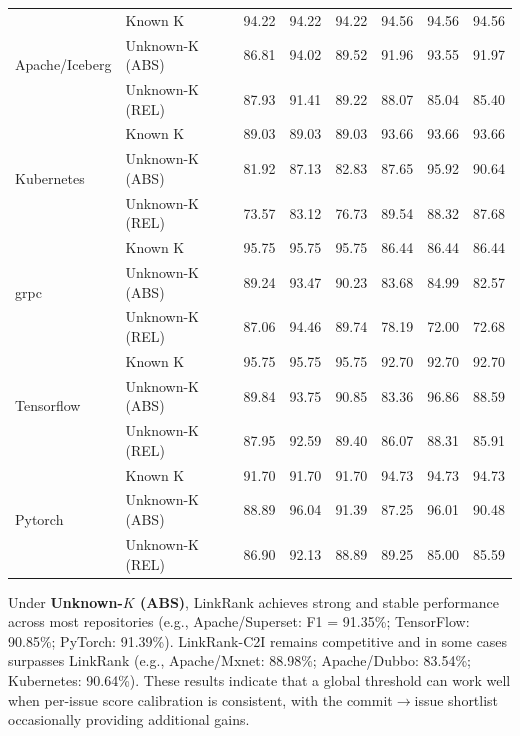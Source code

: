 \begin{table}[htbp]
\begin{tabular}{@{}llcccccc@{}}
\multirow{3}{*}{Apache/Iceberg}
 & Known K         & 94.22 & 94.22 & 94.22 & 94.56 & 94.56 & 94.56 \\
 & Unknown-K (ABS) & 86.81 & 94.02 & 89.52 & 91.96 & 93.55 & 91.97 \\
 & Unknown-K (REL) & 87.93 & 91.41 & 89.22 & 88.07 & 85.04 & 85.40 \\
\midrule

\multirow{3}{*}{Kubernetes}
 & Known K         & 89.03 & 89.03 & 89.03 & 93.66 & 93.66 & 93.66 \\
 & Unknown-K (ABS) & 81.92 & 87.13 & 82.83 & 87.65 & 95.92 & 90.64 \\
 & Unknown-K (REL) & 73.57 & 83.12 & 76.73 & 89.54 & 88.32 & 87.68 \\
\midrule

\multirow{3}{*}{grpc}
 & Known K         & 95.75 & 95.75 & 95.75 & 86.44 & 86.44 & 86.44 \\
 & Unknown-K (ABS) & 89.24 & 93.47 & 90.23 & 83.68 & 84.99 & 82.57 \\
 & Unknown-K (REL) & 87.06 & 94.46 & 89.74 & 78.19 & 72.00 & 72.68 \\
\midrule

\multirow{3}{*}{Tensorflow}
 & Known K         & 95.75 & 95.75 & 95.75 & 92.70 & 92.70 & 92.70 \\
 & Unknown-K (ABS) & 89.84 & 93.75 & 90.85 & 83.36 & 96.86 & 88.59 \\
 & Unknown-K (REL) & 87.95 & 92.59 & 89.40 & 86.07 & 88.31 & 85.91 \\
\midrule

\multirow{3}{*}{Pytorch}
 & Known K         & 91.70 & 91.70 & 91.70 & 94.73 & 94.73 & 94.73 \\
 & Unknown-K (ABS) & 88.89 & 96.04 & 91.39 & 87.25 & 96.01 & 90.48 \\
 & Unknown-K (REL) & 86.90 & 92.13 & 88.89 & 89.25 & 85.00 & 85.59 \\
\bottomrule
\end{tabular}
\end{table}

\noindent
Under \textbf {Unknown-$K$ (ABS)}, LinkRank achieves strong and stable performance across most repositories (e.g., Apache/Superset: F1 = 91.35\%; TensorFlow: 90.85\%; PyTorch: 91.39\%). LinkRank-C2I remains competitive and in some cases surpasses LinkRank (e.g., Apache/Mxnet: 88.98\%; Apache/Dubbo: 83.54\%; Kubernetes: 90.64\%). These results indicate that a global threshold can work well when per-issue score calibration is consistent, with the commit$\rightarrow$issue shortlist occasionally providing additional gains.\\


